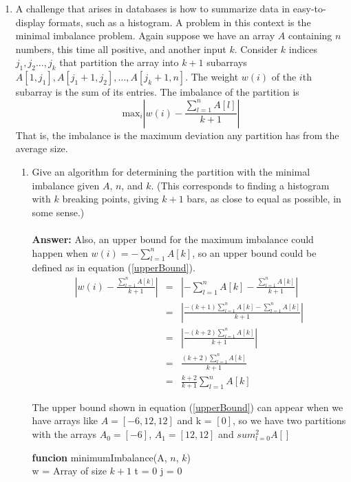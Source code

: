 \documentclass[tikz, 12pt]{scrartcl}
\begin{document}
\begin{enumerate}
	\item A challenge that arises in databases is how to summarize data in easy-to-display formats, such as a histogram. A problem in this context is the minimal imbalance problem. Again suppose we have an array $A$ containing $n$ numbers, this time all positive, and another input $k$. 
	Consider $k$ indices $j_1, j_2 \ldots, j_k$ that partition the array into $k + 1$ subarrays $A[1, j_1], A[j_1 + 1, j_2], \ldots, A[j_k + 1, n]$. The weight $w(i)$ of the $i$th subarray is the sum of its entries. The imbalance of the partition is
	$$
	\text{max}_i \left| w(i) - \frac{\sum_{l = 1}^n A[l]}{k + 1} \right|
	$$
That is, the imbalance is the maximum deviation any partition has from the average size.\\
	\begin{enumerate}
		\item Give an algorithm for determining the partition with the minimal imbalance given $A$, $n$, and $k$. (This corresponds to finding a histogram with $k$ breaking points, giving $k + 1$ bars, as close to equal as possible, in some sense.) \\
		\\
		\textbf{Answer: }
		Also, an upper bound for the maximum imbalance could happen when $w(i) = -\sum_{l = 1}^nA[k]$,  so an upper bound could be defined as in equation (\ref{upperBound}).
		\begin{eqnarray}
		\left| w(i) - \frac{\sum_{l = 1}^n A[k]}{k + 1} \right|	&	=	&	\left| - \sum_{l = 1}^n A[k] - \frac{\sum_{l = 1}^n A[k]}{k + 1} \right| \nonumber \\
			&	=	&	\left| \frac{-(k + 1)\sum_{l = 1}^n A[k] - \sum_{l = 1}^n A[k]}{k + 1}\right| \nonumber \\
			& 	=	&	\left|  \frac{-(k + 2)\sum_{l = 1}^n A[k]}{k + 1}\right| \nonumber \\
			& 	=	&	\frac{(k + 2)\sum_{l = 1}^n A[k]}{k + 1}\nonumber \\
			& 	=	&	\frac{k + 2}{k + 1}\sum_{l = 1}^n A[k] \label{upperBound}
		\end{eqnarray}

The upper bound shown in equation (\ref{upperBound}) can appear when we have arrays like $A = [-6, 12, 12]$ and k = $[0]$, so we have two partitions with the arrays $A_0 =[-6]$, $A_1 = [12,12]$ and $sum_{l=0}^2A[]$
		
		\begin{algorithm}[th!]
	{\bf funcion} minimumImbalance(A, $n$, $k$)\\
	w = Array of size $k + 1$ 
	t = 0 
	j = 0 
\end{algorithm}
\end{enumerate}
\end{enumerate}
\end{document}
